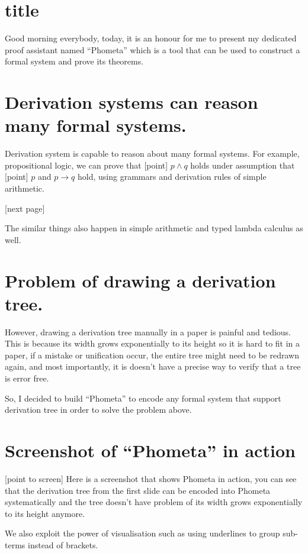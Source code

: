 \documentclass[11pt, a4paper]{article}
\begin{document}
\section{title}

Good morning everybody, today, it is an honour for me to present my dedicated
proof assistant named ``Phometa'' which is a tool that can be used to construct
a formal system and prove its theorems.

\section{Derivation systems can reason many formal systems.}

Derivation system is capable to reason about many formal systems. For example,
propositional logic, we can prove that [point] $p \wedge q$ holds under
assumption that [point] $p$ and $p \rightarrow q$ hold, using grammars and
derivation rules of simple arithmetic.

[next page]

The similar things also happen in simple arithmetic and typed lambda calculus as
well.

\section{Problem of drawing a derivation tree.}

However, drawing a derivation tree manually in a paper is painful and
tedious. This is because its width grows exponentially to its height so it is
hard to fit in a paper, if a mistake or unification occur, the entire tree might
need to be redrawn again, and most importantly, it is doesn't have a precise way
to verify that a tree is error free.

So, I decided to build ``Phometa'' to encode any formal system that support
derivation tree in order to solve the problem above.

\section{Screenshot of  ``Phometa'' in action}

[point to screen] Here is a screenshot that shows Phometa in action, you can see
that the derivation tree from the first slide can be encoded into Phometa
systematically and the tree doesn't have problem of its width grows
exponentially to its height anymore.

We also exploit the power of visualisation such as using underlines to group
sub-terms instead of brackets.
\end{document}

